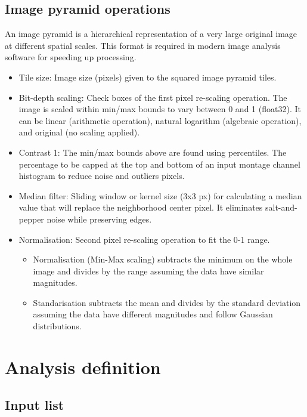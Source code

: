 	\subsection{Image pyramid operations}
	
	An image pyramid is a hierarchical representation of a very large original image at different spatial scales. This format is required in modern image analysis software for speeding up processing.
	
	\begin{itemize}
		
		\item Tile size: Image size (pixels) given to the squared image pyramid tiles.
		\item Bit-depth scaling: Check boxes of the first pixel re-scaling operation. The image is scaled within min/max bounds to vary between 0 and 1 (float32). It can be linear (arithmetic operation), natural logarithm (algebraic operation), and original (no scaling applied).
		\item Contrast 1: The min/max bounds above are found using percentiles. The percentage to be capped at the top and bottom of an input montage channel histogram to reduce noise and outliers pixels.
		\item Median filter: Sliding window or kernel size (3x3 px) for calculating a median value that will replace the neighborhood center pixel. It eliminates salt-and-pepper noise while preserving edges.
		\item Normalisation: Second pixel re-scaling operation to fit the 0-1 range. 
			\begin{itemize}
				\item Normalisation (Min-Max scaling) subtracts the minimum on the whole image and divides by the range assuming the data have similar magnitudes.
				\item Standarisation subtracts the mean and divides by the standard deviation assuming the data have different magnitudes and follow Gaussian distributions.
			\end{itemize}		
		
	\end{itemize}
	
	\section{Analysis definition}
	
	\subsection{Input list}	
	
